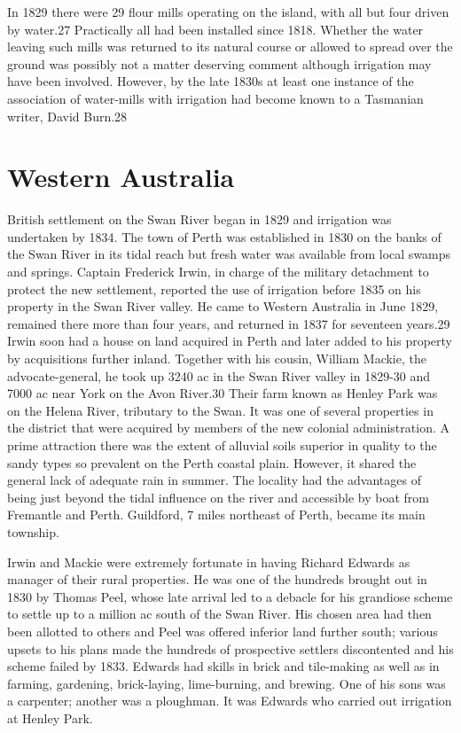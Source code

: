 In 1829 there were 29 flour mills operating on the island, with all
but four driven by water.27 Practically all had been installed since
1818. Whether the water leaving such mills was returned to its natural
course or allowed to spread over the ground was possibly not a matter
deserving comment although irrigation may have been involved. However,
by the late 1830s at least one instance of the association of
water-mills with irrigation had become known to a Tasmanian writer,
David Burn.28

\section{Western Australia}

British settlement on the Swan River began in 1829 and irrigation was
undertaken by 1834. The town of Perth was established in 1830 on the
banks of the Swan River in its tidal reach but fresh water was
available from local swamps and springs. Captain Frederick Irwin, in
charge of the military detachment to protect the new settlement,
reported the use of irrigation before 1835 on his property in the Swan
River valley. He came to Western Australia in June 1829, remained
there more than four years, and returned in 1837 for seventeen
years.29 Irwin soon had a house on land acquired in Perth and later
added to his property by acquisitions further inland. Together with
his cousin, William Mackie, the advocate-general, he took up 3240 ac
in the Swan River valley in 1829-30 and 7000 ac near York on the Avon
River.30 Their farm known as Henley Park was on the Helena River,
tributary to the Swan. It was one of several properties in the
district that were acquired by members of the new colonial
administration. A prime attraction there was the extent of alluvial
soils superior in quality to the sandy types so prevalent on the Perth
coastal plain. However, it shared the general lack of adequate rain in
summer. The locality had the advantages of being just beyond the tidal
influence on the river and accessible by boat from Fremantle and
Perth. Guildford, 7 miles northeast of Perth, became its main
township.

Irwin and Mackie were extremely fortunate in having Richard Edwards as
manager of their rural properties. He was one of the hundreds brought
out in 1830 by Thomas Peel, whose late arrival led to a debacle for
his grandiose scheme to settle up to a million ac south of the Swan
River. His chosen area had then been allotted to others and Peel was
offered inferior land further south; various upsets to his plans made
the hundreds of prospective settlers discontented and his scheme
failed by 1833. Edwards had skills in brick and tile-making as well as
in farming, gardening, brick-laying, lime-burning, and brewing. One of
his sons was a carpenter; another was a ploughman. It was Edwards who
carried out irrigation at Henley Park.

